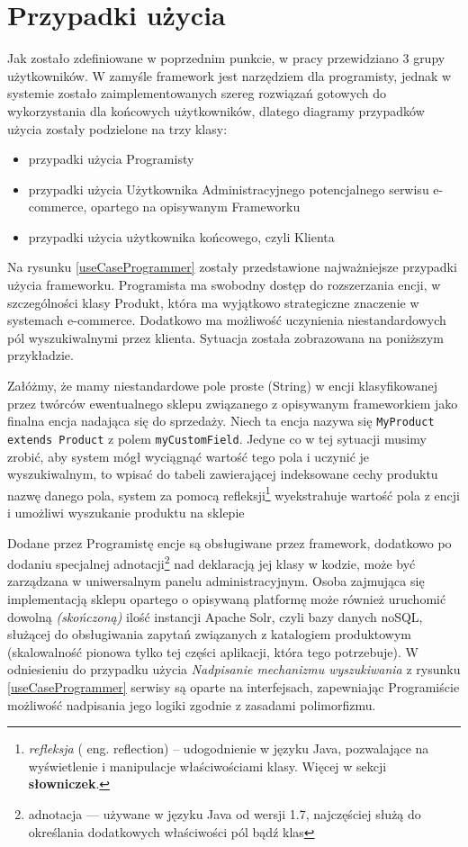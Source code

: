\section{Przypadki użycia}
Jak zostało zdefiniowane w poprzednim punkcie, w pracy przewidziano 3 grupy użytkowników. W zamyśle framework jest narzędziem dla programisty, jednak w systemie zostało zaimplementowanych szereg rozwiązań gotowych do wykorzystania dla końcowych użytkowników, dlatego diagramy przypadków użycia zostały podzielone na trzy klasy: 
\begin{itemize}
	\item przypadki użycia Programisty 
	\item przypadki użycia Użytkownika Administracyjnego potencjalnego serwisu e-commerce, opartego na opisywanym Frameworku
	\item przypadki użycia użytkownika końcowego, czyli Klienta
\end{itemize}
Na rysunku \ref{useCaseProgrammer} zostały przedstawione najważniejsze przypadki użycia frameworku. Programista ma swobodny dostęp do rozszerzania encji, w szczególności klasy Produkt, która ma wyjątkowo strategiczne znaczenie w systemach e-commerce. Dodatkowo ma możliwość uczynienia niestandardowych pól wyszukiwalnymi przez klienta. Sytuacja została zobrazowana na poniższym przykładzie.
\begin{example}
	Załóżmy, że mamy niestandardowe pole proste (String) w encji klasyfikowanej przez twórców ewentualnego sklepu związanego z opisywanym frameworkiem jako finalna encja nadająca się do sprzedaży. Niech ta encja nazywa się \texttt{MyProduct extends Product} z polem \texttt{myCustomField}. Jedyne co w tej sytuacji musimy zrobić, aby system mógł wyciągnąć wartość tego pola i uczynić je wyszukiwalnym, to wpisać do tabeli zawierającej indeksowane cechy produktu nazwę danego pola, system za pomocą refleksji\footnote{\textit{refleksja} ( eng. reflection) -- udogodnienie w języku Java, pozwalające na wyświetlenie i manipulacje właściwościami klasy. Więcej w sekcji \textbf{słowniczek}.} wyekstrahuje wartość pola z encji i umożliwi wyszukanie produktu na sklepie
\end{example}

Dodane przez Programistę encje są obsługiwane przez framework, dodatkowo po dodaniu specjalnej adnotacji\footnote{adnotacja — używane w języku Java od wersji 1.7, najczęściej służą do określania dodatkowych właściwości pól bądź klas} nad deklaracją jej klasy w kodzie, może być zarządzana w uniwersalnym panelu administracyjnym. Osoba zajmująca się implementacją sklepu opartego o opisywaną platformę może również uruchomić dowolną \textit{(skończoną)} ilość instancji Apache Solr, czyli bazy danych noSQL, służącej do obsługiwania zapytań związanych z katalogiem produktowym (skalowalność pionowa tylko tej części aplikacji, która tego potrzebuje). W odniesieniu do przypadku użycia \textit{Nadpisanie mechanizmu wyszukiwania} z rysunku \ref{useCaseProgrammer} serwisy są oparte na interfejsach, zapewniając Programiście możliwość nadpisania jego logiki zgodnie z zasadami polimorfizmu. 

